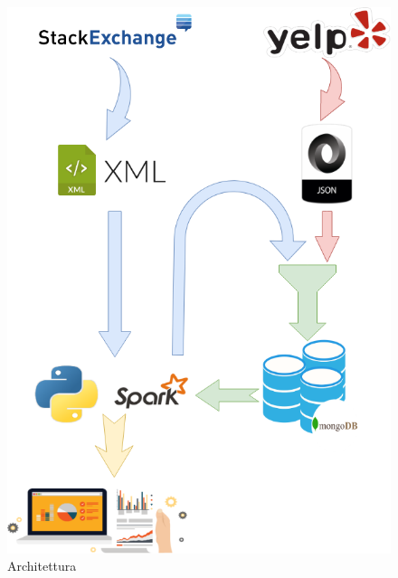 \begin{figure}[H]
	\centering
	\includegraphics[scale=0.5]{./image/BDABI.png}
	\caption{Architettura}
	\label{fig:arc}
\end{figure}